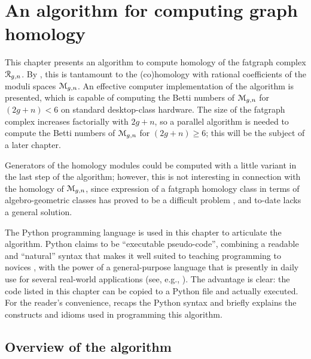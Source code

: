 
\chapter{An algorithm for computing graph homology}
\label{chap:algorithm}

This chapter presents an algorithm to compute homology of the fatgraph
complex $\mathcal{R}_{g,n}$.  By , this is
tantamount to the (co)homology with rational coefficients of the
moduli spaces $\mathcal{M}_{g,n}$. An effective computer implementation of the
algorithm is presented, which is capable of computing the Betti
numbers of $\mathcal{M}_{g,n}$ for $(2g+n) < 6$ on standard desktop-class
hardware.  The size of the fatgraph complex increases factorially with
$2g+n$, so a parallel algorithm is needed to compute the Betti numbers
of $\mathcal{M}_{g,n}$ for $(2g+n) \geq 6$; this will be the subject of a later
chapter.

Generators of the homology modules could be computed with a little
variant in the last step of the algorithm; however, this is not
interesting in connection with the homology of $\mathcal{M}_{g,n}$, since
expression of a fatgraph homology class in terms of algebro-geometric
classes has proved to be a difficult problem 
\cite{mondello:2004,
  igusa:combinatorial-miller-morita-mumford-classes-and-witten-cycles,
  igusa:graph-cohomology-and-kontsevich-cycles},
and to-date lacks a general solution.

The Python programming language is used in this chapter to articulate
the algorithm.  Python claims to be ``executable pseudo-code'',
combining a readable and ``natural'' syntax that makes it well suited
to teaching programming to novices \cite{georgatos:python}, with the
power of a general-purpose language that is presently in daily use for
several real-world applications (see, e.g., \cite{python:success}).
The advantage is clear: the code listed in this chapter can be copied
to a Python file and actually executed.  For the reader's convenience,
 recaps the Python syntax and briefly explains the
constructs and idioms used in programming this algorithm.


\section[Overview]{Overview of the algorithm}
\label{sec:overview}

